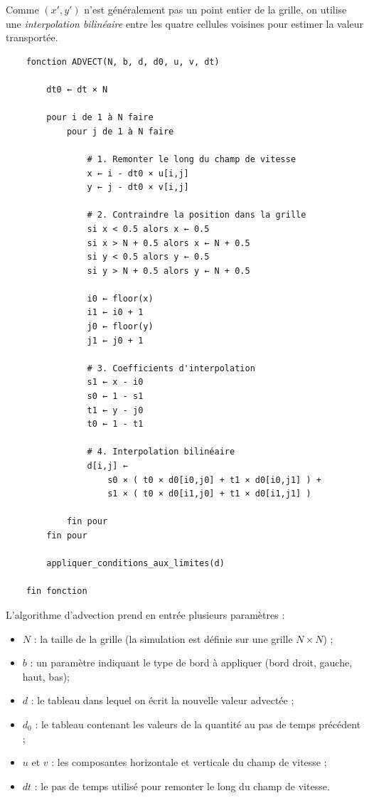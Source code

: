 \documentclass[a4paper]{article}
\begin{document}
Comme $(x',y')$ n'est généralement pas un point entier de la grille, on utilise une \emph{interpolation bilinéaire} entre les quatre cellules voisines pour estimer la valeur transportée.


\begin{verbatim}
    fonction ADVECT(N, b, d, d0, u, v, dt)

        dt0 ← dt × N

        pour i de 1 à N faire
            pour j de 1 à N faire
                
                # 1. Remonter le long du champ de vitesse
                x ← i - dt0 × u[i,j]
                y ← j - dt0 × v[i,j]

                # 2. Contraindre la position dans la grille
                si x < 0.5 alors x ← 0.5
                si x > N + 0.5 alors x ← N + 0.5
                si y < 0.5 alors y ← 0.5
                si y > N + 0.5 alors y ← N + 0.5

                i0 ← floor(x)
                i1 ← i0 + 1
                j0 ← floor(y)
                j1 ← j0 + 1

                # 3. Coefficients d'interpolation
                s1 ← x - i0
                s0 ← 1 - s1
                t1 ← y - j0
                t0 ← 1 - t1

                # 4. Interpolation bilinéaire
                d[i,j] ← 
                    s0 × ( t0 × d0[i0,j0] + t1 × d0[i0,j1] ) + 
                    s1 × ( t0 × d0[i1,j0] + t1 × d0[i1,j1] )

            fin pour
        fin pour

        appliquer_conditions_aux_limites(d)

    fin fonction
\end{verbatim}

L’algorithme d’advection prend en entrée plusieurs paramètres :

\begin{itemize}
    \item $N$ : la taille de la grille (la simulation est définie sur une grille $N \times N$) ;
    \item $b$ : un paramètre indiquant le type de bord à appliquer (bord droit, gauche, haut, bas);
    \item $d$ : le tableau dans lequel on écrit la nouvelle valeur advectée ;
    \item $d_0$ : le tableau contenant les valeurs de la quantité au pas de temps précédent ;
    \item $u$ et $v$ : les composantes horizontale et verticale du champ de vitesse ;
    \item $dt$ : le pas de temps utilisé pour remonter le long du champ de vitesse.
\end{itemize}
\end{document}
